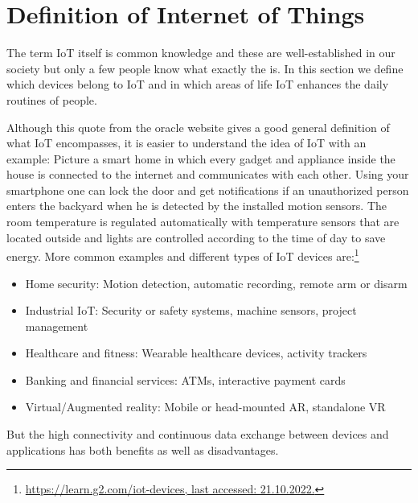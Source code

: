 \section{Definition of Internet of Things}\label{sec:def}
The term IoT itself is common knowledge and these \emph{} are well-established in our society but only a few people know what exactly the \emph{} is. In this section we define which devices belong to IoT and in which areas of life IoT enhances the daily routines of people.
\begin{quote}
	\emph{}
\end{quote}
Although this quote from the oracle website gives a good general definition of what IoT encompasses, it is easier to understand the idea of IoT with an example: Picture a smart home in which every gadget and appliance inside the house is connected to the internet and communicates with each other. Using your smartphone one can lock the door and get notifications if an unauthorized person enters the backyard when he is detected by the installed motion sensors. The room temperature is regulated automatically with temperature sensors that are located outside and lights are controlled according to the time of day to save energy. More common examples and different types of IoT devices are:\footnote{\href{https://learn.g2.com/iot-devices}{https://learn.g2.com/iot-devices, last accessed: 21.10.2022.}}
\begin{itemize}
	\item Home security: Motion detection, automatic recording, remote arm or disarm
	\item Industrial IoT: Security or safety systems, machine sensors, project management
	\item Healthcare and fitness: Wearable healthcare devices, activity trackers
	\item Banking and financial services: ATMs, interactive payment cards
	\item Virtual/Augmented reality: Mobile or head-mounted AR, standalone VR
\end{itemize}
But the high connectivity and continuous data exchange between devices and applications has both benefits as well as disadvantages. 

